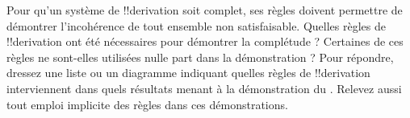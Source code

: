 \documentclass[../../../include/open-logic-section]{subfiles}
\begin{document}
\begin{prob}
Pour qu'un système de !!{derivation} soit complet, ses règles doivent
permettre de démontrer l'incohérence de tout ensemble non
satisfaisable. Quelles règles de !!{derivation} ont été nécessaires
pour démontrer la complétude ? Certaines de ces règles ne sont-elles
utilisées nulle part dans la démonstration ? Pour répondre, dressez
une liste ou un diagramme indiquant quelles règles de !!{derivation}
interviennent dans quels résultats menant à la démonstration du
. Relevez aussi tout emploi
implicite des règles dans ces démonstrations.
\end{prob}
\tagendprob
\end{document}
